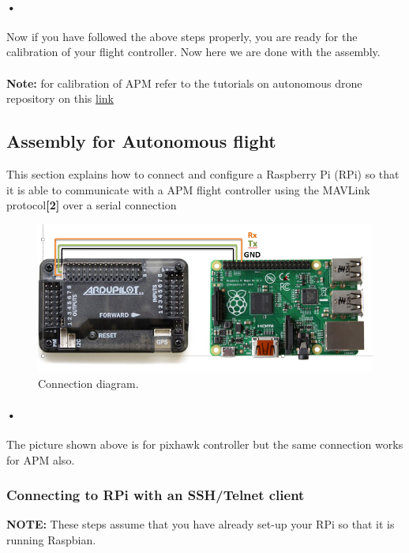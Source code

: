 \documentclass[a4paper,12pt,oneside]{book}
\begin{document}
	\paragraph{•}
	Now if you have followed the above steps properly, you are ready for the calibration of your flight controller. Now here we are done with the assembly.
	
	\paragraph{}\textbf{Note:} for calibration of APM refer to the tutorials on autonomous drone repository on this \href{https://github.com/eYSIP-2016/Autonomous-Drone/tree/master/Tutorials/Calibarting-APM}{link}
\subsection{Assembly for Autonomous flight}
This section explains how to connect and configure a Raspberry Pi (RPi) so that it is able to communicate with a APM flight controller using the MAVLink protocol\textbf{[2]} over a serial connection
	 \begin{figure}[H]
	 	\centering
		\includegraphics[scale=0.35]{apmtopi}
	 	\caption{Connection diagram.}
\end{figure}
	\paragraph{•} The picture shown above is for pixhawk controller but the same connection works for APM also.
	 \subsubsection{Connecting to RPi with an SSH/Telnet client}
	 \textbf{NOTE:} These steps assume that you have already set-up your RPi so that it is running Raspbian.
\end{document}
